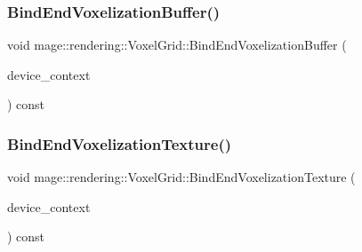 \hypertarget{classmage_1_1rendering_1_1_voxel_grid_a2da6ce7a6880b1fc65b36757d8111062}{}\label{classmage_1_1rendering_1_1_voxel_grid_a2da6ce7a6880b1fc65b36757d8111062} 
\subsubsection{\texorpdfstring{Bind\+End\+Voxelization\+Buffer()}{BindEndVoxelizationBuffer()}}
{\footnotesize\ttfamily void mage\+::rendering\+::\+Voxel\+Grid\+::\+Bind\+End\+Voxelization\+Buffer (\begin{DoxyParamCaption}\item[{I\+D3\+D11\+Device\+Context \&}]{device\+\_\+context }\end{DoxyParamCaption}) const\hspace{0.3cm}{\ttfamily [noexcept]}}

\hypertarget{classmage_1_1rendering_1_1_voxel_grid_ac404f5cb8fd1293e2351ae6106f37fe5}{}\label{classmage_1_1rendering_1_1_voxel_grid_ac404f5cb8fd1293e2351ae6106f37fe5} 
\subsubsection{\texorpdfstring{Bind\+End\+Voxelization\+Texture()}{BindEndVoxelizationTexture()}}
{\footnotesize\ttfamily void mage\+::rendering\+::\+Voxel\+Grid\+::\+Bind\+End\+Voxelization\+Texture (\begin{DoxyParamCaption}\item[{I\+D3\+D11\+Device\+Context \&}]{device\+\_\+context }\end{DoxyParamCaption}) const\hspace{0.3cm}{\ttfamily [noexcept]}}

\hypertarget{classmage_1_1rendering_1_1_voxel_grid_ab38b97d6f567f2f44fa000a6bb9f305c}{}\label{classmage_1_1rendering_1_1_voxel_grid_ab38b97d6f567f2f44fa000a6bb9f305c} 
